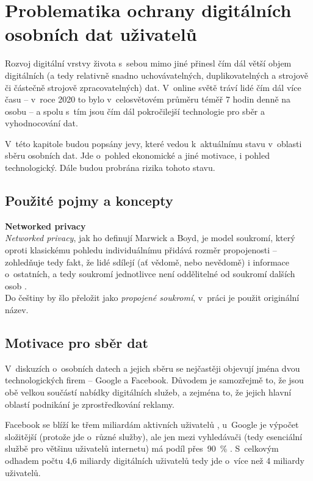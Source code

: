 \chapter{Problematika ochrany digitálních\\ osobních dat uživatelů}

Rozvoj digitální vrstvy života s~sebou mimo jiné přinesl čím dál větší objem digitálních (a tedy relativně snadno uchovávatelných, duplikovatelných a strojově či částečně strojově zpracovatelných) dat. V~online světě tráví lidé čím dál více času -- v~roce 2020 to bylo v~celosvětovém průměru téměř 7 hodin denně na osobu \citep{digital-2021-report} -- a spolu s~tím jsou čím dál pokročilejší technologie pro sběr a vyhodnocování dat.

V~této kapitole budou popsány jevy, které vedou k~aktuálnímu stavu v~oblasti sběru osobních dat.
Jde o~pohled ekonomické a jiné motivace, i pohled technologický.
Dále budou probrána rizika tohoto stavu.

\section*{Použité pojmy a koncepty}

\textbf{Networked privacy}\\
\textit{Networked privacy}, jak ho definují Marwick a Boyd, je model soukromí, který oproti klasickému pohledu individuálnímu přidává rozměr propojenosti -- zohledňuje tedy fakt, že lidé sdílejí (ať vědomě, nebo nevědomě) i informace o~ostatních, a tedy soukromí jednotlivce není oddělitelné od soukromí dalších osob \citep{networked-privacy}.\\
Do češtiny by šlo přeložit jako \textit{propojené soukromí}, v~práci je použit originální název.

\section{Motivace pro sběr dat}

V~diskuzích o~osobních datech a jejich sběru se nejčastěji objevují jména dvou technologických firem -- Google a Facebook. Důvodem je samozřejmě to, že jsou obě velkou součástí nabídky digitálních služeb, a zejména to, že jejich hlavní oblastí podnikání je zprostředkování reklamy.

Facebook se blíží ke třem miliardám aktivních uživatelů \citep{facebook-active-users}, u~Google je výpočet složitější (protože jde o~různé služby), ale jen mezi vyhledávači (tedy esenciální službě pro většinu uživatelů internetu) má podíl přes~90~\% \citep{google-search}. S~celkovým odhadem počtu 4,6 miliardy digitálních uživatelů \citep{digital-2021-report} tedy jde o~více než 4 miliardy uživatelů.

